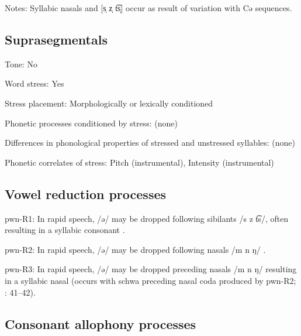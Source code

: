 {\begin{appendixdesc}
\item[Notes:] Syllabic nasals and [s̩ z̩ t͡s̩] occur as result of variation with Cə sequences.
\end{appendixdesc}
\subsection*{Suprasegmentals}
\begin{appendixdesc}
\item[Tone:] No

\item[Word stress:] Yes

\item[Stress placement:] Morphologically or lexically conditioned

\item[Phonetic processes conditioned by stress:] (none)

\item[Differences in phonological properties of stressed and unstressed syllables:] (none)

\item[Phonetic correlates of stress:] Pitch (instrumental), Intensity (instrumental)
\end{appendixdesc}
\subsection*{Vowel reduction processes}
\begin{appendixdesc}

\item[pwn-R1:] In rapid speech, /ə/ may be dropped following sibilants /s z t͡s/, often resulting in a syllabic consonant \citep[40--41]{Chang2006}.

\item[pwn-R2:] In rapid speech, /ə/ may be dropped following nasals /m n ŋ/ \citep[41]{Chang2006}.

\item[pwn-R3:] In rapid speech, /ə/ may be dropped preceding nasals /m n ŋ/ resulting in a syllabic nasal (occurs with schwa preceding nasal coda produced by pwn-R2; \citealt{Chang2006}: 41--42).
\end{appendixdesc}
\subsection*{Consonant allophony processes}
\begin{appendixdesc}


\end{appendixdesc}}
